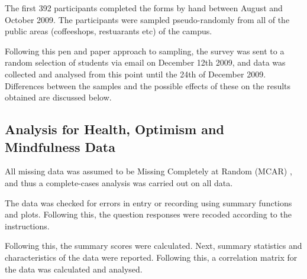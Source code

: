 \documentclass{article}
\begin{document}
The first 392 participants completed the forms by hand between August and October 2009. The participants were sampled pseudo-randomly from all of the public areas (coffeeshops, restuarants etc) of the campus.

Following this pen and paper approach to sampling, the survey was sent to a random selection of students via email on December 12th 2009, and data was collected and analysed from this point until the 24th of December 2009. Differences between the samples and the possible effects of these on the results obtained are discussed below. %

\subsection{Analysis for Health, Optimism and Mindfulness Data}


All missing data was assumed to be Missing Completely at Random (MCAR) \cite{little1987statistical}, and thus a complete-cases analysis was carried out on all data. 

The data was checked for errors in entry or recording using summary functions and plots. Following this, the question responses were recoded according to the instructions.

Following this, the summary scores were calculated. Next, summary statistics and characteristics of the data were reported. 
Following this, a correlation matrix for the data was calculated and analysed.

\end{document}
